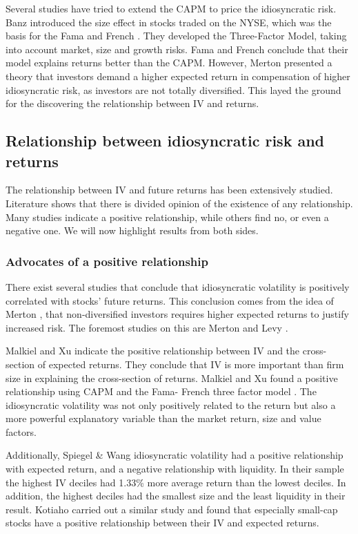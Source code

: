 Several studies have tried to extend the CAPM to price the idiosyncratic risk. Banz \cite{banz} introduced the size effect in stocks traded on the NYSE, which was the basis for the Fama and French \cite{famafrench}. They developed the Three-Factor Model, taking into account market, size and growth risks. Fama and French \cite{famafrench} conclude that their model explains returns better than the CAPM. However, Merton \cite{merton87} presented a theory that investors demand a higher expected return in compensation of higher idiosyncratic risk, as investors are not totally diversified. This layed the ground for the discovering the relationship between IV and returns.

\subsection{Relationship between idiosyncratic risk and returns}
The relationship between IV and future returns has been extensively studied. Literature shows that there is divided opinion of the existence of any relationship. Many studies indicate a positive relationship, while others find no, or even a negative one. We will now highlight results from both sides.

\subsubsection{Advocates of a positive relationship}
There exist several studies that conclude that idiosyncratic volatility is positively correlated with stocks' future returns. This conclusion comes from the idea of Merton \cite{merton87}, that non-diversified investors requires higher expected returns to justify increased risk. The foremost studies on this are Merton \cite{merton73} and Levy \cite{levy}.

Malkiel and Xu \cite{malkielxu02} indicate the positive relationship between IV and the cross-section of expected returns. They conclude that IV is more important than firm size in explaining the cross-section of returns. Malkiel and Xu \cite{malkielxu04} found a positive relationship using CAPM and the Fama- French three factor model \cite{famafrench}. The idiosyncratic volatility was not only positively related to the return but also a more powerful explanatory variable than the market return, size and value factors.
 
Additionally, Spiegel & Wang  \cite{spiegelwang} idiosyncratic volatility had a positive relationship with expected return, and a negative relationship with liquidity. In their sample the highest IV deciles had 1.33\% more average return than the lowest deciles. In addition, the highest deciles had the smallest size and the least liquidity in their result. Kotiaho \cite{kotiaho} carried out a similar study and found that especially small-cap stocks have a positive relationship between their IV and expected returns.

